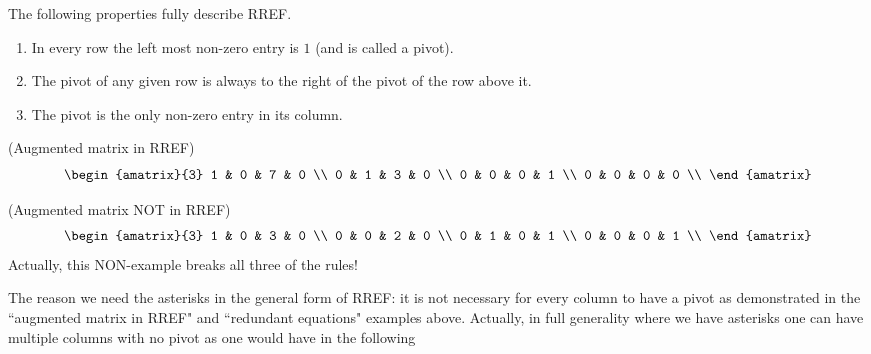 
\noindent
The following properties fully describe  RREF.

\begin{enumerate}
\item  In every row  the left most non-zero entry is  $1$ (and is called a pivot).

\item The pivot of any given row is always to the right of the pivot of the row above it.

\item The pivot is the only non-zero entry in its column.
\end{enumerate}

\begin{example} (Augmented matrix in RREF)
\[
\begin{amatrix}{3} 
1 & 0 & 7 & 0 \\ 
0 & 1 & 3 & 0 \\
0 & 0 & 0 & 1 \\
0 & 0 & 0 & 0 \\
\end{amatrix}
\]
\end{example}

\begin{example} (Augmented matrix NOT in RREF)
\[
\begin{amatrix}{3} 
1 & 0 & 3 & 0 \\ 
0 & 0 & 2 & 0 \\
0 & 1 & 0 & 1 \\
0 & 0 & 0 & 1 \\
\end{amatrix}
\]
Actually, this NON-example breaks all three of the rules!
\end{example}


The reason we need the asterisks in the general form of RREF:
it is not necessary for every column to have a pivot as demonstrated in the ``augmented matrix in RREF" and ``redundant equations" examples above. 
Actually, in full generality where we have asterisks one can have multiple columns with no pivot as one would have in the following

